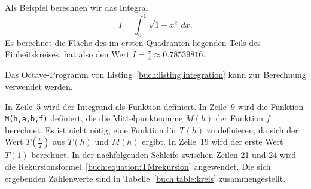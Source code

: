 \begin{beispiel}
Als Beispiel berechnen wir das Integral 
\begin{equation}
I
=
\int_0^1 \sqrt{1-x^2}\,dx.
\label{buch:equation:kreis}
\end{equation}
Es berechnet die Fläche des im ersten Quadranten liegenden Teils des
Einheitskreises, hat also den Wert $I=\frac{\pi}4\approx 0.78539816$.
%
%

Das Octave-Programm von Listing~\ref{buch:listing:integration} kann zur
Berechnung verwendet werden.
%

In Zeile~5 wird der Integrand als Funktion definiert.
In Zeile~9 wird die Funktion \texttt{M(h,a,b,f)} definiert, die
die Mittelpunktsumme $M(h)$ der Funktion $f$ berechnet.
Es ist nicht nötig, eine Funktion für $T(h)$ zu definieren, da
sich der Wert $T({\textstyle\frac{h}2})$ aus $T(h)$ und $M(h)$ ergibt.
In Zeile~19 wird der erste Wert $T(1)$ berechnet,
In der nachfolgenden Schleife zwischen Zeilen 21 und 24 wird die
Rekursionsformel~\eqref{buch:equation:TMrekursion} angewendet.
Die sich ergebenden Zahlenwerte sind in Tabelle~\ref{buch:table:kreis}
zusammengestellt.


\end{beispiel}
